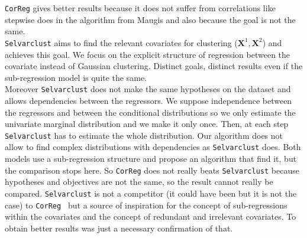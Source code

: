 \documentclass[12pt,a4paper]{report}
\begin{document}
{\tt CorReg} gives better results because it does not suffer from correlations like stepwise does in the algorithm from Maugis and also because the goal is not the same. \\
{\tt Selvarclust} aims to find the relevant covariates for clustering ($\boldsymbol{X}^1,\boldsymbol{X}^2$) and achieves this goal. We focus on the explicit structure of regression between the covariate instead of Gaussian clustering. Distinct goals, distinct results even if the sub-regression model is quite the same.\\
Moreover {\tt Selvarclust} does not make the same hypotheses on the dataset and allows dependencies between the regressors.
We suppose independence between the regressors and between the conditional distributions so we only estimate the univariate marginal distribution and we make it only once.
	 Then, at each step {\tt Selvarclust} has to estimate the whole distribution. Our algorithm does not allow to find complex distributions with dependencies as {\tt Selvarclust} does. Both models use a sub-regression structure and propose an algorithm that find it, but the comparison stops here. So {\tt CorReg} does not really beats {\tt Selvarclust} because hypotheses and objectives are not the same,  so the result cannot really be compared. {\tt Selvarclust} is not a competitor (it could have been but it is not the case) to {\tt CorReg } but a source of inspiration for the concept of sub-regressions within the covariates and the concept of redundant and irrelevant covariates. To obtain better results was just a necessary confirmation of that.
\end{document}
